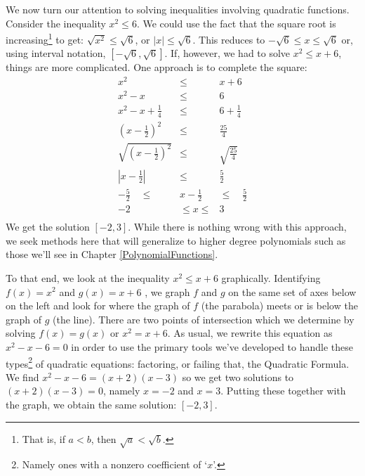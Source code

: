 We now turn our attention to solving inequalities involving quadratic functions.   Consider the inequality $x^2 \leq 6$.  We could use the fact that the square root is increasing\footnote{That is, if $a < b$, then $\sqrt{a} < \sqrt{b}$.} to get: $\sqrt{x^2} \leq \sqrt{6}$, or $|x| \leq \sqrt{6}$.  This reduces to $-\sqrt{6} \leq x \leq \sqrt{6}$ or, using interval notation, $[-\sqrt{6}, \sqrt{6}]$. If, however, we had to solve $x^2 \leq x+6$, things are more complicated.  One approach is to complete the square: \[ \begin{array}{rcl}

x^2 & \leq & x+6 \\
x^2 - x & \leq & 6 \\
x^2 - x + \frac{1}{4} & \leq &  6 + \frac{1}{4} \\ [3pt]

\left(x - \frac{1}{2} \right)^2 & \leq & \frac{25}{4} \\ [3pt]

\sqrt{\left(x - \frac{1}{2} \right)^2} & \leq & \sqrt{\frac{25}{4}} \\ [3pt]

\left| x - \frac{1}{2} \right| & \leq & \frac{5}{2} \\ 

-\frac{5}{2} \quad \leq & x - \frac{1}{2} & \leq \quad \frac{5}{2} \\ 

-2 \quad &  \leq  x  \leq & 3 \\  \end{array} \] We get the solution $[-2,3]$.  While there is nothing wrong with this approach, we seek methods here that will generalize to higher degree polynomials such as those we'll see in Chapter \ref{PolynomialFunctions}.  

\medskip

To that end, we look at the inequality $x^2 \leq x+6$ graphically.  Identifying $f(x) = x^2$ and $g(x) = x+6$ , we graph $f$ and $g$ on the same set of axes below on the left and look for where the graph of $f$ (the parabola) meets or is below the graph of $g$ (the line).  There are two points of intersection which we determine by solving  $f(x) = g(x)$ or $x^2=x+6$.  As usual, we rewrite this equation as $x^2-x-6 = 0$ in order to use the primary tools we've developed to handle these types\footnote{Namely ones with a nonzero coefficient of `$x$'.} of quadratic equations: factoring, or failing that, the Quadratic Formula.  We find $x^2-x-6 = (x+2)(x-3)$ so we get two solutions to $(x+2)(x-3) = 0$, namely $x = -2$ and $x = 3$.  Putting these together with the graph, we obtain the same solution:  $[-2,3]$.  

